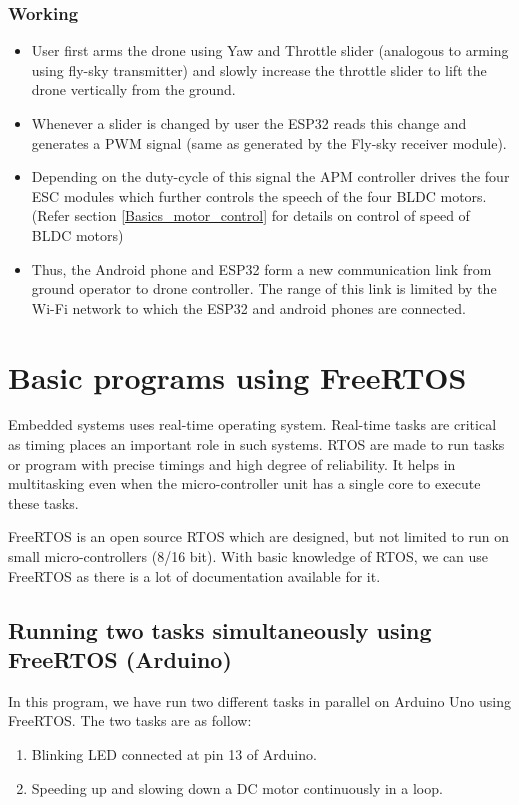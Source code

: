 \subsubsection{Working}
\begin{itemize}
    \item User first arms the drone using Yaw and Throttle slider (analogous to arming using fly-sky transmitter) and slowly increase the throttle slider to lift the drone vertically from the ground.
    \item Whenever a slider is changed by user the ESP32 reads this change and generates a PWM signal (same as generated by the Fly-sky receiver module).
    \item Depending on the duty-cycle of this signal the APM controller drives the four ESC modules which further controls the speech of the four BLDC motors. (Refer section \ref{Basics_motor_control} for details on control of speed of BLDC motors)
    \item Thus, the Android phone and ESP32 form a new communication link from ground operator to drone controller. The range of this link is limited by the Wi-Fi network to which the ESP32 and android phones are connected.
\end{itemize}

\newpage

\section{Basic programs using FreeRTOS}

Embedded systems uses real-time operating system. Real-time tasks are critical as timing places an important role in such systems. RTOS are made to run tasks or program with precise timings and high degree of reliability. It helps in multitasking even when the micro-controller unit has a single core to execute these tasks.

FreeRTOS is an open source RTOS which are designed, but not limited to run on small micro-controllers (8/16 bit). With basic knowledge of RTOS, we can use FreeRTOS as there is a lot of documentation available for it.

\subsection{Running two tasks simultaneously using FreeRTOS (Arduino) }

In this program, we have run two different tasks in parallel on Arduino Uno using FreeRTOS. The two tasks are as follow:
\begin{enumerate}
    \item Blinking LED connected at pin 13 of Arduino.
    \item Speeding up and slowing down a DC motor continuously in a loop.
\end{enumerate}

